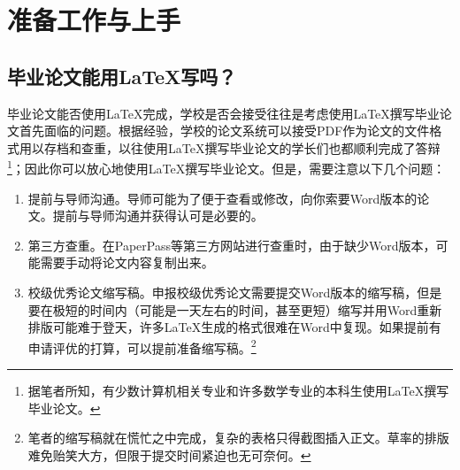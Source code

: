 %
%
%
%
%
%
%

\chapter{准备工作与上手}

\section{毕业论文能用\LaTeX 写吗？}
毕业论文能否使用\LaTeX 完成，学校是否会接受往往是考虑使用\LaTeX 撰写毕业论文首先面临的问题。根据经验，学校的论文系统可以接受PDF作为论文的文件格式用以存档和查重，以往使用\LaTeX 撰写毕业论文的学长们也都顺利完成了答辩\footnote{据笔者所知，有少数计算机相关专业和许多数学专业的本科生使用\LaTeX 撰写毕业论文。}；因此你可以放心地使用\LaTeX 撰写毕业论文。但是，需要注意以下几个问题：
\begin{enumerate}
  \item 提前与导师沟通。导师可能为了便于查看或修改，向你索要Word版本的论文。提前与导师沟通并获得认可是必要的。
  \item 第三方查重。在PaperPass等第三方网站进行查重时，由于缺少Word版本，可能需要手动将论文内容复制出来。
  \item 校级优秀论文缩写稿。申报校级优秀论文需要提交Word版本的缩写稿，但是要在极短的时间内（可能是一天左右的时间，甚至更短）缩写并用Word重新排版可能难于登天，许多\LaTeX 生成的格式很难在Word中复现。如果提前有申请评优的打算，可以提前准备缩写稿。\footnote{笔者的缩写稿就在慌忙之中完成，复杂的表格只得截图插入正文。草率的排版难免贻笑大方，但限于提交时间紧迫也无可奈何。}
\end{enumerate}

